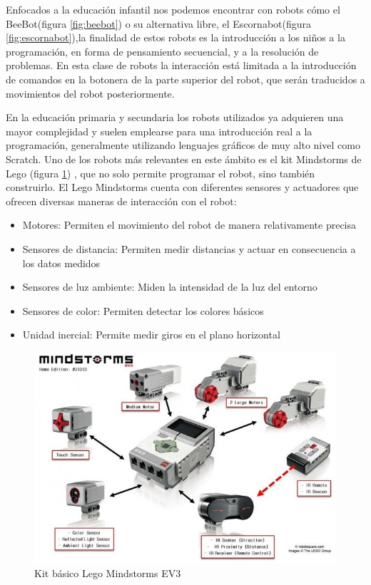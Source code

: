  Enfocados a la educación infantil nos podemos encontrar con robots cómo el BeeBot(figura \ref{fig:beebot}) o su alternativa libre, el Escornabot(figura \ref{fig:escornabot}),la finalidad de estos robots es la introducción a los niños a la programación, en forma de pensamiento secuencial, y a la resolución de problemas. En esta clase de robots la interacción está limitada a la introducción de comandos en la botonera de la parte superior del robot, que serán traducidos a movimientos del robot posteriormente.  

 En la educación primaria y secundaria los robots utilizados ya adquieren una mayor complejidad y suelen emplearse para una introducción real a la programación, generalmente utilizando lenguajes gráficos de muy alto nivel como Scratch\cite{scratch}. Uno de los robots más relevantes en este ámbito es el kit Mindstorms de Lego (figura \ref{fig:legoev3}) , que no solo permite programar el robot, sino también construirlo. El Lego Mindstorms cuenta con diferentes sensores y actuadores que ofrecen diversas maneras de interacción con el robot:
 \begin{itemize}
 	\item Motores: Permiten el movimiento del robot de manera relativamente precisa
 	\item Sensores de distancia: Permiten medir distancias y actuar en consecuencia a los datos medidos
 	\item Sensores de luz ambiente: Miden la intensidad de la luz del entorno
 	\item Sensores de color: Permiten detectar los colores básicos
 	\item Unidad inercial: Permite medir giros en el plano horizontal
 \end{itemize}
 
   \begin{figure}
	\centering
	\includegraphics[width=0.8\linewidth]{imagenes/legoev3.jpg}
	\caption{Kit básico Lego Mindstorms EV3}
	\label{fig:legoev3}
\end{figure} 

